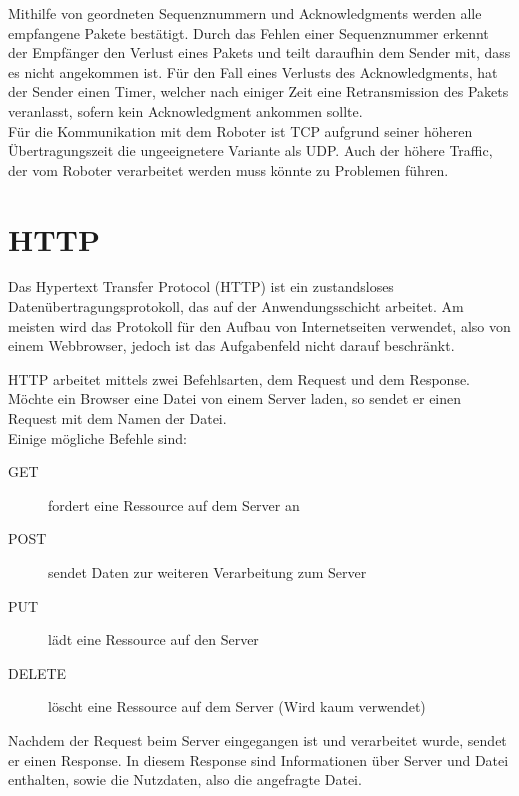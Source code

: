 Mithilfe von geordneten Sequenznummern und Acknowledgments werden alle empfangene Pakete bestätigt. Durch das Fehlen einer Sequenznummer erkennt der Empfänger den Verlust eines Pakets und teilt daraufhin dem Sender mit, dass es nicht angekommen ist. Für den Fall eines Verlusts des Acknowledgments, hat der Sender einen Timer, welcher nach einiger Zeit eine Retransmission des Pakets veranlasst, sofern kein Acknowledgment ankommen sollte. \\

Für die Kommunikation mit dem Roboter ist TCP aufgrund seiner höheren Übertragungszeit die ungeeignetere Variante als UDP. Auch der höhere Traffic, der vom Roboter verarbeitet werden muss könnte zu Problemen führen.


\section{HTTP}
Das Hypertext Transfer Protocol (HTTP) ist ein zustandsloses Datenübertragungsprotokoll, das auf der Anwendungsschicht arbeitet. Am meisten wird das Protokoll für den Aufbau von Internetseiten verwendet, also von einem Webbrowser, jedoch ist das Aufgabenfeld nicht darauf beschränkt.

HTTP arbeitet mittels zwei Befehlsarten, dem Request und dem Response. Möchte ein Browser eine Datei von einem Server laden, so sendet er einen Request mit dem Namen der Datei. \\
Einige mögliche Befehle sind: 
\begin{description}
	\item[GET] fordert eine Ressource auf dem Server an
	\item[POST] sendet Daten zur weiteren Verarbeitung zum Server
	\item[PUT] lädt eine Ressource auf den Server
	\item[DELETE] löscht eine Ressource auf dem Server (Wird kaum verwendet)
\end{description} Nachdem der Request beim Server eingegangen ist und verarbeitet wurde, sendet er einen Response. In diesem Response sind Informationen über Server und Datei enthalten, sowie die Nutzdaten, also die angefragte Datei. 


